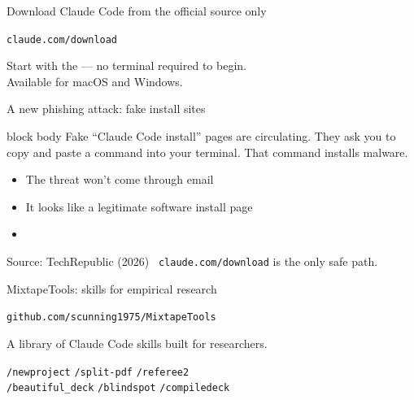 \documentclass[aspectratio=169,11pt]{beamer}
\newcommand{\emphbox}[1]{%
  \begin{beamercolorbox}[rounded=true,sep=7pt,wd=\linewidth]{block body}%
    \small\color{slate} #1%
  \end{beamercolorbox}}
\begin{document}

\begin{frame}{Download Claude Code from the official source only}
\vspace{0.8em}
\begin{center}
\Large\texttt{claude.com/download}
\end{center}
\vspace{0.8em}
\begin{center}
\color{warmgray}
Start with the  --- no terminal required to begin.\\[0.4em]
Available for macOS and Windows.
\end{center}
\end{frame}

\begin{frame}{A new phishing attack: fake install sites}
\vspace{0.6em}
\emphbox{Fake ``Claude Code install'' pages are circulating. They ask you to copy and paste a command into your terminal. That command installs malware.}
\vspace{0.6em}
\begin{itemize}\setlength\itemsep{0.5em}
  \item The threat won't come through email
  \item It looks like a legitimate software install page
  \item {}
\end{itemize}
\vspace{0.4em}
\begin{center}\color{warmgray}\small
Source: TechRepublic (2026) \textperiodcentered\ \texttt{claude.com/download} is the only safe path.
\end{center}
\end{frame}


\begin{frame}{MixtapeTools: skills for empirical research}
\vspace{0.8em}
\begin{center}
\Large\texttt{github.com/scunning1975/MixtapeTools}
\end{center}
\vspace{0.8em}
\begin{center}
\color{warmgray}\normalsize
A library of Claude Code skills built for researchers.\\[0.6em]
\end{center}
\begin{center}
\texttt{/newproject} \quad \texttt{/split-pdf} \quad \texttt{/referee2}\\[0.4em]
\texttt{/beautiful\_deck} \quad \texttt{/blindspot} \quad \texttt{/compiledeck}
\end{center}
\end{frame}
\end{document}
